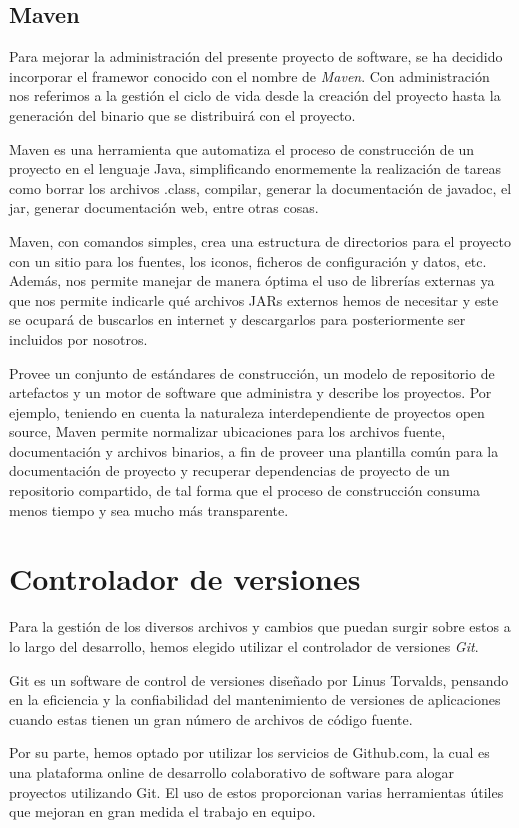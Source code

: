 \documentclass{book}
\begin{document}
\subsection{Maven}

Para mejorar la administración del presente proyecto de software, se ha decidido incorporar el framewor conocido con el nombre de \textit{Maven}. Con administración nos referimos a la gestión el ciclo de vida desde la creación del proyecto hasta la generación del binario que se distribuirá con el proyecto.
\par
Maven es una herramienta que automatiza el proceso de construcción de un proyecto en el lenguaje Java, simplificando enormemente la realización de tareas como borrar los archivos .class, compilar, generar la documentación de javadoc, el jar, generar documentación web, entre otras cosas.
\par
Maven, con comandos simples, crea una estructura de directorios para el proyecto con un sitio para los fuentes, los iconos, ficheros de configuración y datos, etc. Además, nos permite manejar de manera óptima el uso de librerías externas ya que nos permite indicarle qué archivos JARs externos hemos de necesitar y este se ocupará de buscarlos en internet y descargarlos para posteriormente ser incluidos por nosotros.
\par
Provee un conjunto de estándares de construcción, un modelo de repositorio de artefactos y un motor de software que administra y describe los proyectos. Por ejemplo, teniendo en cuenta la naturaleza interdependiente de proyectos open source, Maven permite normalizar ubicaciones para los archivos fuente, documentación y archivos binarios, a fin de proveer una plantilla común para la documentación de proyecto y recuperar dependencias de proyecto de un repositorio compartido, de tal forma que el proceso de construcción consuma menos tiempo y sea mucho más transparente.
\medskip


\section{Controlador de versiones}

Para la gestión de los diversos archivos y cambios que puedan surgir sobre estos a lo largo del desarrollo, hemos elegido utilizar el controlador de versiones \textit{Git}. 
\par
Git es un software de control de versiones diseñado por Linus Torvalds, pensando en la eficiencia y la confiabilidad del mantenimiento de versiones de aplicaciones cuando estas tienen un gran número de archivos de código fuente.
\par
Por su parte, hemos optado por utilizar los servicios de Github.com, la cual es una plataforma online de desarrollo colaborativo de software para alogar proyectos utilizando Git. El uso de estos proporcionan varias herramientas útiles que mejoran en gran medida el trabajo en equipo.
\medskip
\end{document}
